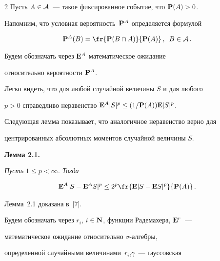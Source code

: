 \begin{multicols}{2}
Пусть  $A\in\AD$~--- такое фиксированное событие, что $\P(A)>0$.


Напомним, что условная вероятность~${\P^A}$ определяется формулой


 $$


 \P^A(B)=\fr{\P(B\cap A)}{\P(A)}\,,\enskip  B \in\AD\,.


 $$


Будем обозначать через ${\E}^A$  математическое ожидание


относительно вероятности $\P^A$.





Легко видеть, что для любой случайной величины $S$ и  для любого


 $p>0$ справедливо неравенство ${\E}^A|S|^p\le (1/\P(A)){\E}|S|^p$.


 Следующая лемма показывает, что аналогичное неравенство верно для


центрированных абсолютных моментов случайной величины $S$.





\medskip





\noindent


\textbf{Лемма 2.1.} {\it Пусть $1\le  p<\infty$. Тогда


\begin{equation}


 {\E}^A|S-{\E}^AS|^p   \le  2^p\fr{{\E}|S-{\E}S|^p}{{\P}(A)}\,.


\label{e2.1faz}


\end{equation}}





\medskip





Лемма~2.1 доказана в~[7].





\medskip





Будем обозначать через $r_i$, $i\in\N$,  функции Радемахера, $\E^r$~--- 


математическое ожидание относительно $\sigma$-алгебры,


определенной случайными величинами~$r_i$,$\gamma$~--- гауссовская



\end{multicols}
